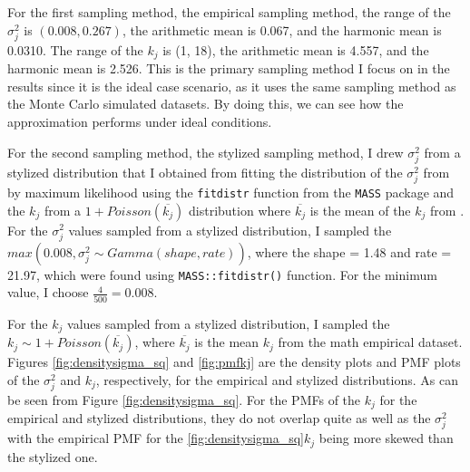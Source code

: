 For the first sampling method, the empirical sampling method, the range of the $\sigma_j^2$ is $(0.008, 0.267)$, the arithmetic mean is 0.067, and the harmonic mean is 0.0310. The range of the $k_j$ is (1, 18), the arithmetic mean is 4.557, and the harmonic mean is 2.526. This is the primary sampling method I focus on in the results since it is the ideal case scenario, as it uses the same sampling method as the Monte Carlo simulated datasets. By doing this, we can see how the approximation performs under ideal conditions.

For the second sampling method, the stylized sampling method, I drew 
$\sigma^2_j$ from a stylized distribution that I obtained from fitting the distribution of the $\sigma^2_j$ from \textcite{WilliamsRyan2022HiMI} by maximum likelihood using the  \texttt{fitdistr} function from the \texttt{MASS} package \autocite{venables2003} and the $k_j$ from a $1 + Poisson(\overline{k_j})$ distribution where $\overline{k_j}$ is the mean of the $k_j$ from \textcite{WilliamsRyan2022HiMI}. For the $\sigma_j^2$ values sampled from a stylized distribution, I sampled the $max(0.008,\sigma_j^2 \sim Gamma(shape, rate))$, where the shape = 1.48 and rate = 21.97, which were found using \texttt{MASS::fitdistr()} function. For the minimum value, I choose $\frac{4}{500}=0.008$. 



For the $k_j$ values sampled from a stylized distribution, I sampled the $k_j \sim 1+Poisson(\overline{k_j})$, where  $\overline{k_j}$ is the mean $k_j$ from the math empirical dataset. Figures \ref{fig:densitysigma_sq} and \ref{fig:pmfkj} are the density plots and PMF plots of the $\sigma_j^2$ and $k_j$, respectively, for the empirical and stylized distributions. As can be seen from Figure \ref{fig:densitysigma_sq}. For the PMFs of the $k_j$ for the empirical and stylized distributions, they do not overlap quite as well as the $\sigma_j^2$ with the empirical PMF for the \ref{fig:densitysigma_sq}$k_j$ being more skewed than the stylized one.


